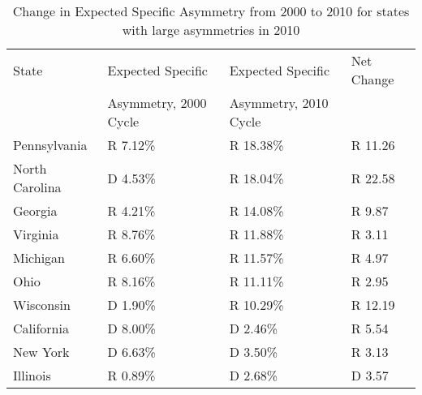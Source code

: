 \begin{table}[htb!]
\centering
\caption{Change in Expected Specific Asymmetry from 2000 to 2010 for states with large asymmetries in 2010 \label{tab:Asym2000to2010}}
\begin{tabular}{|l|l|l|l|}
\hline
State & Expected Specific     & Expected Specific & Net Change\\
      & Asymmetry, 2000 Cycle & Asymmetry, 2010 Cycle & \\
\hline
\hline
Pennsylvania & R 7.12\% & R 18.38\% & R 11.26\\
\hline
North Carolina & D 4.53\% & R 18.04\% & R 22.58\\
\hline
Georgia & R 4.21\% & R 14.08\% & R 9.87\\
\hline
Virginia & R 8.76\% & R 11.88\% & R 3.11\\
\hline
Michigan & R 6.60\% & R 11.57\% & R 4.97\\
\hline
Ohio & R 8.16\% & R 11.11\% & R 2.95\\
\hline
Wisconsin & D 1.90\% & R 10.29\% & R 12.19\\
\hline
California & D 8.00\% & D 2.46\% & R 5.54\\
\hline
New York & D 6.63\% & D 3.50\% & R 3.13\\
\hline
Illinois & R 0.89\% & D 2.68\% & D 3.57\\
\hline
\end{tabular}
\end{table}
